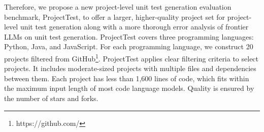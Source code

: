 

% 
Therefore, we propose a new project-level unit test generation evaluation benchmark, ProjectTest, to offer a larger, higher-quality project set for project-level unit test generation along with a more thorough error analysis of frontier LLMs on unit test generation.
ProjectTest covers three programming languages: Python, Java, and JavaScript. For each programming language, we construct 20 projects filtered from GitHub\footnote{https://github.com/}. 
ProjectTest applies clear filtering criteria to select projects. It includes moderate-sized projects with multiple files and dependencies between them. Each project has less than 1,600 lines of code, which fits within the maximum input length of most code language models. Quality is ensured by the number of stars and forks. 


%



